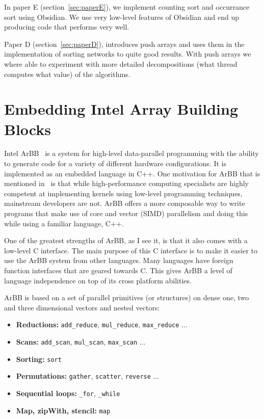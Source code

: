 \documentclass[a4paper]{book}
\begin{document}
In paper E (section~\ref{sec:paperE}), we implement counting sort and occurrance sort 
using Obsidian. We use very low-level features of Obsidian and end up producing 
code that performs very well. 

Paper D (section~\ref{sec:paperD}), introduces push arrays and uses them in the 
implementation of sorting networks to quite good results. With push arrays we 
where able to experiment with more detailed decompositions (what thread computes 
what value) of the algorithms. 

%
%
\section{Embedding Intel Array Building Blocks} 

Intel ArBB~\citet{ARBB2011} is a system for high-level data-parallel programming with the 
ability to generate code for a variety of different hardware configurations. It is implemented 
as an embedded language in C++. One motivation for ArBB that is mentioned in~\citet{ARBB2011} is 
that while high-performance computing specialists are highly competent at implementing 
kernels using low-level programming techniques, mainstream developers are not. ArBB offers 
a more composable way to write programs that make use of core and vector (SIMD) parallelism and 
doing this while using a familiar language, C++.  

One of the greatest strengths of ArBB, as I see it, is that it also comes with a low-level C 
interface. The main purpose of this C interface is to make it easier to use the ArBB system 
from other languages. Many languages have foreign function interfaces that are geared towards C.
This gives ArBB a level of language independence on top of its cross platform abilities.  


ArBB is based on a set of parallel primitives (or structures) on dense one, two and three dimensional vectors and nested vectors: 
\begin{itemize} 
\item {\bf Reductions:}   {\tt add\_reduce}, {\tt mul\_reduce}, {\tt max\_reduce} ... 
\item {\bf Scans:}        {\tt add\_scan}, {\tt mul\_scan}, {\tt max\_scan} ... 
\item {\bf Sorting:}      {\tt sort} 
\item {\bf Permutations:} {\tt gather}, {\tt scatter}, {\tt reverse} ...
\item {\bf Sequential loops:} {\tt \_for}, {\tt \_while} 
\item {\bf Map, zipWith, stencil:}  {\tt map} 
\end{itemize}
\end{document}
